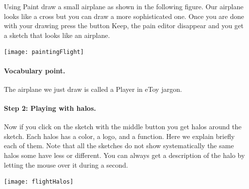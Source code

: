 Using Paint draw a small airplane as shown in the following figure. Our airplane looks like a cross but you can draw a more sophisticated one. Once you are done with your drawing press the button Keep, the pain editor disappear and you get a sketch that looks like an airplane. 
\begin{center}\texttt{[image: paintingFlight]}\end{center}

\paragraph{Vocabulary point.} The airplane we just draw is called a Player in eToy jargon. 


\paragraph{Step 2: Playing with halos.}
Now if you click on the sketch with the middle button you get halos around the sketch. Each halos has a color, a logo, and a function. Here we explain briefly each of them. Note that all the sketches do not show systematically the same halos some have less or different. You can always get a description of the halo by letting the mouse over it during a second. 
\begin{center}\texttt{[image: flightHalos]}\end{center}

